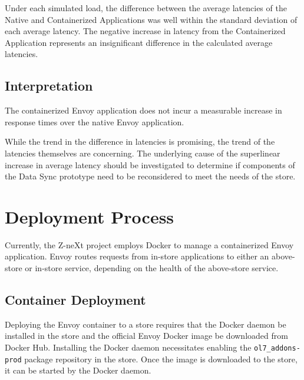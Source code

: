 \documentclass{article}
\begin{document}

Under each simulated load, the difference between the average latencies of the Native and Containerized Applications was well within the standard deviation of each average latency. The negative increase in latency from the Containerized Application represents an insignificant difference in the calculated average latencies.

\subsection{Interpretation}
The containerized Envoy application does not incur a measurable increase in response times over the native Envoy application.

While the trend in the difference in latencies is promising, the trend of the latencies themselves are concerning. The underlying cause of the superlinear increase in average latency should be investigated to determine if components of the Data Sync prototype need to be reconsidered to meet the needs of the store.

\section{Deployment Process}
Currently, the Z-neXt project employs Docker to manage a containerized Envoy application. Envoy routes requests from in-store applications to either an above-store or in-store service, depending on the health of the above-store service.

\subsection{Container Deployment}
Deploying the Envoy container to a store requires that the Docker daemon be installed in the store and the official Envoy Docker image be downloaded from Docker Hub. Installing the Docker daemon necessitates enabling the \texttt{ol7\_addons-prod} package repository in the store. Once the image is downloaded to the store, it can be started by the Docker daemon.
\end{document}
